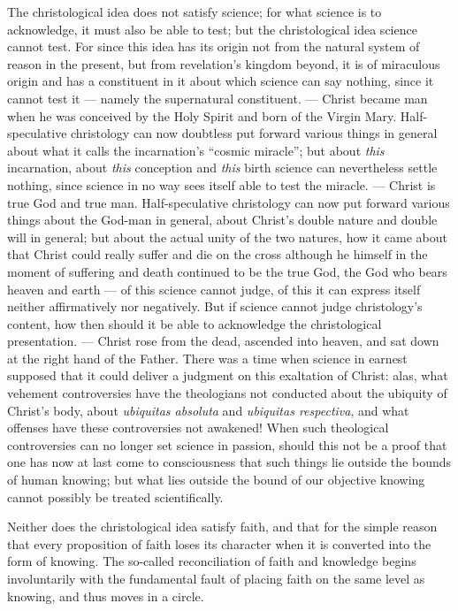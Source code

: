 \documentclass[12pt,a4paper]{book}
\begin{document}
The christological idea does not satisfy science; for what science is to acknowledge, it must
also be able to test; but the christological idea science cannot test. For since this idea
has its origin not from the natural system of reason in the present, but from revelation's
kingdom beyond, it is of miraculous origin and has a constituent in it about which science
can say nothing, since it cannot test it --- namely the supernatural constituent. --- Christ
became man when he was conceived by the Holy Spirit and born
of the Virgin Mary. Half-speculative christology can now doubtless put forward various things
in general about what it calls the incarnation's ``cosmic miracle''; but about \emph{this}
incarnation, about \emph{this} conception and \emph{this} birth science can nevertheless
settle nothing, since science in no way sees itself able to test the miracle. --- Christ is
true God and true man. Half-speculative christology can now put forward various things about
the God-man in general, about Christ's double nature and double will in general; but about the
actual unity of the two natures, how it came about that Christ could really suffer and die on
the cross although he himself in the moment of suffering and death continued to be the true
God, the God who bears heaven and earth --- of this science cannot judge, of this it can
express itself neither affirmatively nor negatively. But if science cannot judge christology's
content, how then should it be able to acknowledge the christological presentation. ---
Christ rose from the dead, ascended into heaven, and sat down at the right hand of the Father.
There was a time when science in earnest supposed that it could deliver a judgment on this
exaltation of Christ: alas, what vehement controversies have the theologians not conducted
about the ubiquity of Christ's body, about \textit{ubiquitas absoluta} and \textit{ubiquitas
respectiva}, and what offenses have these controversies not awakened! When such theological
controversies can no longer set science in passion, should this not be a proof that one has now
at last come to consciousness that such things lie outside the bounds of human knowing; but
what lies outside the bound of our objective knowing cannot possibly be treated scientifically.

Neither does the christological idea satisfy faith, and that for the simple reason that every
proposition of faith loses its character when it is converted into the form of knowing. The
so-called
reconciliation of faith and knowledge begins involuntarily with the fundamental fault of
placing faith on the same level as knowing, and thus moves in a circle.
\end{document}
